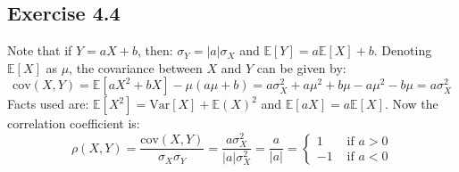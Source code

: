\documentclass{article}
\begin{document}
\subsection*{Exercise 4.4}
\begin{flushleft}
Note that if \(Y = aX + b\), then: \(\sigma_{Y} = |a|\sigma_{X}\) and \(\mathbb{E}[Y] = a\mathbb{E}[X] + b\). Denoting \(\mathbb{E}[X]\) as \(\mu\), the covariance between \(X\) and \(Y\) can be given by:
\begin{equation}
\mathrm{cov}(X, Y) = \mathbb{E}[aX^2 + bX] - \mu(a\mu + b) = a\sigma_{X}^{2} + a\mu^{2} + b\mu - a\mu^{2} - b\mu = a\sigma_{X}^{2}
\end{equation}
Facts used are: \(\mathbb{E}[X^2] = \mathrm{Var}[X] + \mathbb{E}(X)^2\) and \(\mathbb{E}[aX] = a\mathbb{E}[X]\). Now the correlation coefficient is:
\begin{equation}
\rho(X, Y) = \frac{\mathrm{cov}(X, Y)}{\sigma_{X}\sigma_{Y}} = \frac{a\sigma_{X}^{2}}{|a|\sigma_{X}^{2}} = \frac{a}{|a|} =
\begin{cases}
1 & \text{ if } a > 0 \\
-1 & \text{ if } a < 0
\end{cases}
\end{equation}
\end{flushleft}
\end{document}
